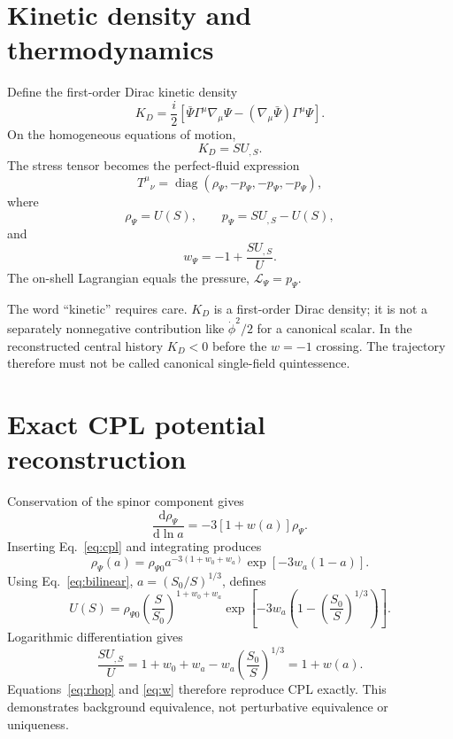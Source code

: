 \documentclass[11pt]{article}
\newcommand{\dd}{\mathrm{d}}
\begin{document}
\section{Kinetic density and thermodynamics}

Define the first-order Dirac kinetic density
\begin{equation}
  K_D=\frac{i}{2}\left[
  \bar\Psi\Gamma^\mu\nabla_\mu\Psi
  -(\nabla_\mu\bar\Psi)\Gamma^\mu\Psi
  \right].
\end{equation}
On the homogeneous equations of motion,
\begin{equation}
  K_D=SU_{,S}.
  \label{eq:kinetic}
\end{equation}
The stress tensor becomes the perfect-fluid expression
\begin{equation}
  T^\mu{}_{\nu}=\operatorname{diag}
  (\rho_\Psi,-p_\Psi,-p_\Psi,-p_\Psi),
\end{equation}
where
\begin{equation}
  \boxed{\rho_\Psi=U(S)},
  \qquad
  \boxed{p_\Psi=SU_{,S}-U(S)},
  \label{eq:rhop}
\end{equation}
and
\begin{equation}
  \boxed{w_\Psi=-1+\frac{SU_{,S}}{U}}.
  \label{eq:w}
\end{equation}
The on-shell Lagrangian equals the pressure,
$\mathcal L_\Psi=p_\Psi$.

The word ``kinetic'' requires care.  $K_D$ is a first-order Dirac density; it is
not a separately nonnegative contribution like $\dot\phi^2/2$ for a canonical
scalar.  In the reconstructed central history $K_D<0$ before the $w=-1$
crossing.  The trajectory therefore must not be called canonical single-field
quintessence.

\section{Exact CPL potential reconstruction}

Conservation of the spinor component gives
\begin{equation}
  \frac{\dd\rho_\Psi}{\dd\ln a}=-3[1+w(a)]\rho_\Psi.
\end{equation}
Inserting Eq.~\eqref{eq:cpl} and integrating produces
\begin{equation}
  \rho_\Psi(a)=\rho_{\Psi0}
  a^{-3(1+w_0+w_a)}\exp[-3w_a(1-a)].
  \label{eq:density}
\end{equation}
Using Eq.~\eqref{eq:bilinear}, $a=(S_0/S)^{1/3}$, defines
\begin{equation}
\boxed{
  U(S)=\rho_{\Psi0}
  \left(\frac{S}{S_0}\right)^{1+w_0+w_a}
  \exp\left[-3w_a\left(
  1-\left(\frac{S_0}{S}\right)^{1/3}\right)\right]
}.
\label{eq:potential}
\end{equation}
Logarithmic differentiation gives
\begin{equation}
  \frac{SU_{,S}}{U}=1+w_0+w_a-w_a
  \left(\frac{S_0}{S}\right)^{1/3}=1+w(a).
\end{equation}
Equations~\eqref{eq:rhop} and \eqref{eq:w} therefore reproduce CPL exactly.
This demonstrates background equivalence, not perturbative equivalence or
uniqueness.
\end{document}
